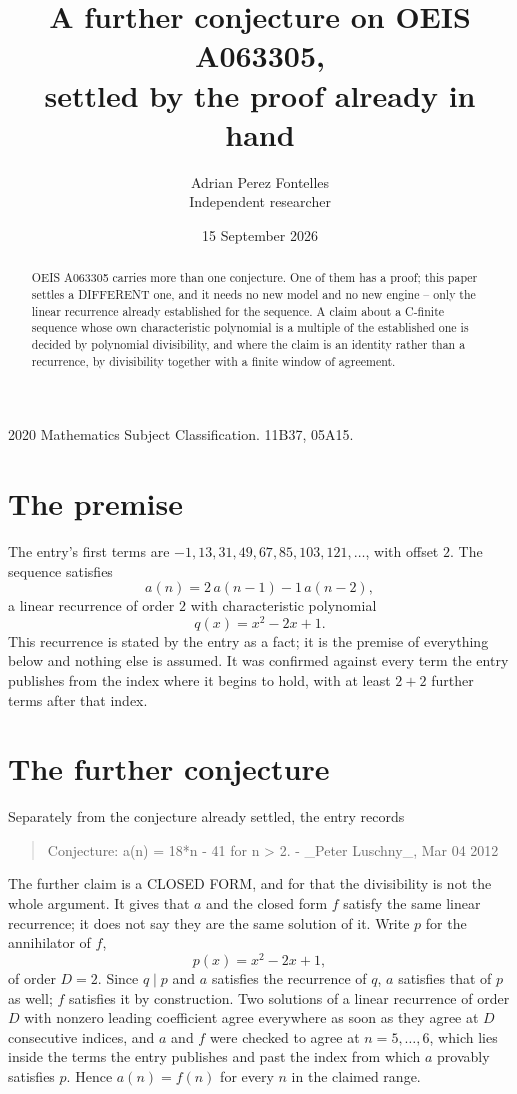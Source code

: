 \documentclass[11pt,a4paper]{article}
\title{A further conjecture on OEIS A063305,\\ \large settled by the proof already in hand}
\author{Adrian Perez Fontelles\\ \small Independent researcher}
\date{15 September 2026}
\theoremstyle{plain}
\theoremstyle{definition}
\begin{document}
\maketitle

\begin{abstract}
OEIS A063305 carries more than one conjecture. One of them has a proof; this paper settles a
DIFFERENT one, and it needs no new model and no new engine -- only the linear recurrence already
established for the sequence. A claim about a C-finite sequence whose own characteristic
polynomial is a multiple of the established one is decided by polynomial divisibility, and where
the claim is an identity rather than a recurrence, by divisibility together with a finite window
of agreement.
\end{abstract}

\noindent\small 2020 Mathematics Subject Classification. 11B37, 05A15.\normalsize

\section{The premise}

The entry's first terms are $-1, 13, 31, 49, 67, 85, 103, 121,\dots$, with offset $2$. The sequence satisfies
\[
  a(n)=2\,a(n-1) - 1\,a(n-2) ,
\]
a linear recurrence of order $2$ with characteristic polynomial
\[
  q(x)=x^{2} - 2 x + 1 .
\]
This recurrence is stated by the entry as a fact; it is the premise of everything below and nothing else is assumed.
It was confirmed against every term the entry publishes from the index where it begins to hold,
with at least $2+2$ further terms after that index.

\section{The further conjecture}

Separately from the conjecture already settled, the entry records

\begin{quote}\raggedright Conjecture: a(n) = 18*n - 41 for n > 2. - \_Peter Luschny\_, Mar 04 2012\end{quote}

The further claim is a CLOSED FORM, and for that the divisibility is not the whole argument. It
gives that $a$ and the closed form $f$ satisfy the same linear recurrence; it does not say they
are the same solution of it. Write $p$ for the annihilator of $f$,
\[
  p(x)=x^{2} - 2 x + 1 ,
\]
of order $D=2$. Since $q\mid p$ and $a$ satisfies the recurrence of $q$, $a$ satisfies that of
$p$ as well; $f$ satisfies it by construction. Two solutions of a linear recurrence of order $D$
with nonzero leading coefficient agree everywhere as soon as they agree at $D$ consecutive
indices, and $a$ and $f$ were checked to agree at $n=5,\dots,6$,
which lies inside the terms the entry publishes and past the index from which $a$ provably
satisfies $p$. Hence $a(n)=f(n)$ for every $n$ in the claimed range.
\end{document}
